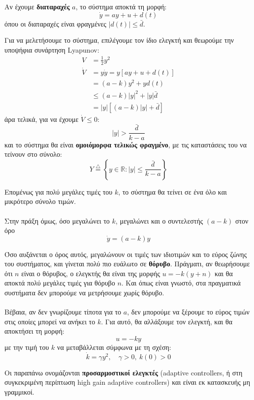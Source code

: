 \documentclass[11pt,a4paper,notitlepage,fleqn]{article}
\begin{document}
Αν έχουμε \textbf{διαταραχές} \( a \), το σύστημα αποκτά τη μορφή:
\[
\dot y = ay + u + d(t)
\]
όπου οι διαταραχές είναι φραγμένες \( \left|d(t)\right|\leq \bar d \).

Για να μελετήσουμε το σύστημα, επιλέγουμε τον ίδιο ελεγκτή και θεωρούμε την υποψήφια συνάρτηση Lyapunov:
\begin{align*}
	V &= \frac{1}{2} y^2 \\
	\dot V &= y\dot y = y\left[ ay + u + d(t) \right]
	\\ &= (a-k)y^2 + yd(t) \\
	&\leq (a-k)|y|^2 + |y|\bar{d}
	\\ &= |y|\left[ (a-k)|y| + \bar d \right]
\end{align*}
άρα τελικά, για να έχουμε \( \dot V \leq 0 \):
\[
|y| > \frac{\bar d}{k-a}
\]
και το σύστημα θα είναι \textbf{ομοιόμορφα τελικώς φραγμένο}, με τις καταστάσεις του να τείνουν στο σύνολο:
\[
Y \overset{\triangle}{=} \left\lbrace
y \in \mathbb R: |y| \leq \frac{\bar{d}}{k-a}
 \right\rbrace
\]

Επομένως για πολύ μεγάλες τιμές του \( k \), το σύστημα θα τείνει σε ένα
όλο και μικρότερο σύνολο τιμών.

\paragraph{}
Στην πράξη όμως, όσο μεγαλώνει το \( k \), μεγαλώνει και ο συντελεστής
\( (a-k) \) στον όρο
\[
\dot y = (a-k) y
\]

Όσο αυξάνεται ο όρος αυτός, μεγαλώνουν οι τιμές των ιδιοτιμών και το εύρος ζώνης του συστήματος, και γίνεται πολύ πιο ευάλωτο σε \textbf{θόρυβο}. Πράγματι, αν θεωρήσουμε ότι \( n \) είναι ο θόρυβος, ο ελεγκτής θα είναι της μορφής \( u = -k(y+n) \) και θα αποκτά πολύ μεγάλες τιμές για θόρυβο
\( n \). Και όπως είναι γνωστό, στα πραγματικά συστήματα δεν μπορούμε να μετρήσουμε χωρίς θόρυβο.

\paragraph{}
Βέβαια, αν δεν γνωρίζουμε τίποτα για το \( a \), δεν μπορούμε να ξέρουμε
το εύρος τιμών στις οποίες μπορεί να ανήκει το \( k \). Για αυτό, θα
αλλάξουμε τον ελεγκτή, και θα αποκτήσει τη μορφή:
\[
u = -ky
\]
με την τιμή του \( k \) να μεταβάλλεται σύμφωνα με τη σχέση:
\[
\dot k = γy^2,\quad \gamma>0,\ k(0) > 0
\]

Οι παραπάνω ονομάζονται \textbf{προσαρμοστικοί ελεγκτές} (adaptive controllers, ή στη συγκεκριμένη περίπτωση high gain adaptive controllers)
και είναι εκ κατασκευής μη γραμμικοί.
\end{document}
